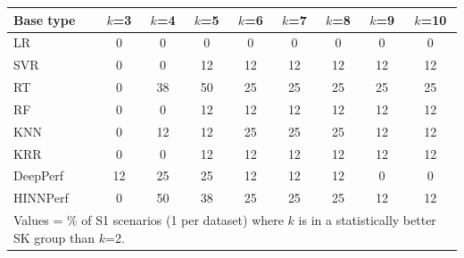 \begin{tabular}{lcccccccc}
\toprule
Base type & $k$=3 & $k$=4 & $k$=5 & $k$=6 & $k$=7 & $k$=8 & $k$=9 & $k$=10 \\
\midrule
LR & 0 & 0 & 0 & 0 & 0 & 0 & 0 & 0 \\
SVR & 0 & 0 & 12 & 12 & 12 & 12 & 12 & 12 \\
RT & 0 & 38 & 50 & 25 & 25 & 25 & 25 & 25 \\
RF & 0 & 0 & 12 & 12 & 12 & 12 & 12 & 12 \\
KNN & 0 & 12 & 12 & 25 & 25 & 25 & 12 & 12 \\
KRR & 0 & 0 & 12 & 12 & 12 & 12 & 12 & 12 \\
DeepPerf & 12 & 25 & 25 & 12 & 12 & 12 & 0 & 0 \\
HINNPerf & 0 & 50 & 38 & 25 & 25 & 25 & 12 & 12 \\
\bottomrule
\multicolumn{9}{l}{\footnotesize Values = \% of S1 scenarios (1 per dataset) where $k$ is in a statistically better SK group than $k$=2.}} \\
\end{tabular}
